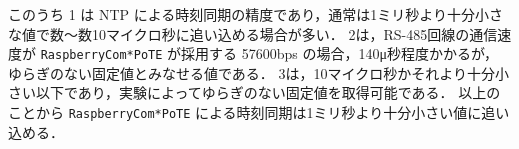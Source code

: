 このうち 1 は NTP による時刻同期の精度であり，通常は1ミリ秒より十分小さな値で数〜数10マイクロ秒に追い込める場合が多い．
2は，RS-485回線の通信速度が {\tt Raspberry\-Com*PoTE} が採用する 57600bps の場合，140μ秒程度かかるが，ゆらぎのない固定値とみなせる値である．
3は，10マイクロ秒かそれより十分小さい以下であり，実験によってゆらぎのない固定値を取得可能である．
以上のことから {\tt Raspberry\-Com*PoTE} による時刻同期は1ミリ秒より十分小さい値に追い込める．


